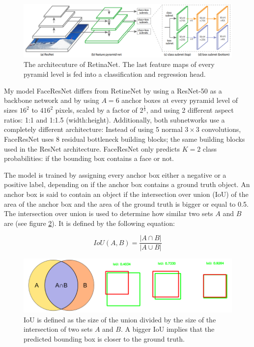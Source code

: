 \documentclass[a4paper, twoside]{article}
\begin{document}
\begin{figure}[h]
	\centering
  		\includegraphics[scale=0.38]{retinanet.png}
  	\caption{The architecuture of RetinaNet. The last feature maps of every pyramid level is fed into a classification and regression head. \cite{retinanet}}\label{figretinanet}
\end{figure}

My model FaceResNet differs from RetineNet by using a ResNet-50 as a backbone network and by using $A=6$ anchor boxes at every pyramid level of sizes $16^2$ to $416^2$ pixels, scaled by a factor of $2^\frac{1}{3}$, and using 2 different aspect ratios: 1:1 and 1:1.5 (width:height). Additionally, both subnetworks use a completely different architecture: Instead of using 5 normal $3 \times 3$ convolutions, FaceResNet uses 8 residual bottleneck building blocks; the same building blocks used in the ResNet architecture. FaceResNet only predicts $K=2$ class probabilities: if the bounding box contains a face or not.

The model is trained by assigning every anchor box either a negative or a positive label, depending on if the anchor box contains a ground truth object. An anchor box is said to contain an object if the intersection over union (IoU) of the area of the anchor box and the area of the ground truth is bigger or equal to 0.5. The intersection over union is used to determine how similar two sets $A$ and $B$ are (see figure \ref{figiou}). It is defined by the following equation: \cite{iou}

\begin{equation}\label{eqiou}
IoU(A, B)=\frac{|A \cap B|}{|A \cup B|}
\end{equation}

\begin{figure}[h]
	\centering
  		\includegraphics[scale=0.5]{iou.png}
  	\caption{IoU is defined as the size of the union divided by the size of the intersection of two sets $A$ and $B$. A bigger IoU implies that the predicted bounding box is closer to the ground truth. \cite{iou}} \label{figiou}
\end{figure}
\end{document}
